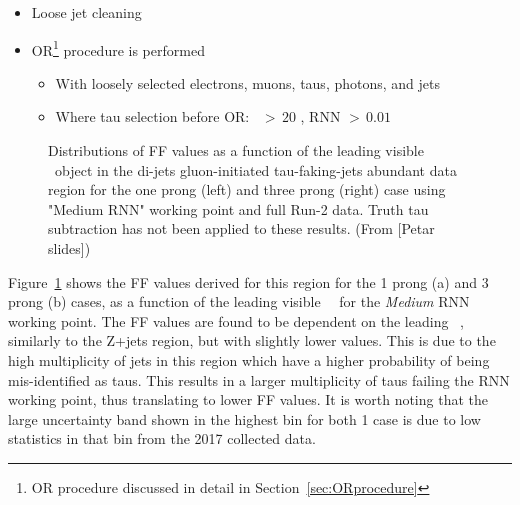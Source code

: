 \begin{itemize}
\begin{itemize}
	\end{itemize}
	\item Loose jet cleaning
	\item \ac{OR}\footnote{\ac{OR} procedure discussed in detail in Section~\ref{sec:ORprocedure}} procedure is performed
	\begin{itemize}
	\item With loosely selected electrons, muons, taus, photons, and jets
	\item Where tau selection before \ac{OR}: \pt\ $>\,20$ \gev, \ac{RNN} $>\,0.01$ 
	\end{itemize}
	\end{itemize}
	\begin{figure}[!htb]
	\begin{center}
			 				\hspace{0.05\textwidth}
							\hspace{0.05\textwidth}
	\end{center}
	\caption{Distributions of FF values as a function of the leading visible \htau\ object in the di-jets gluon-initiated tau-faking-jets abundant data region for the one prong (left) and three prong (right) case using "Medium RNN" working point and full Run-2 data. Truth tau subtraction has not been applied to these results. (From [Petar slides])}
	\label{fig:Dijets_data_FF}
	\end{figure}
	Figure~\ref{fig:Dijets_data_FF} shows the FF values derived for this region for the 1 prong (a) and 3 prong (b) cases, as a function of the leading visible \htau\ \pt\ for the \textit{Medium} RNN working point. The FF values are found to be dependent on the leading \htau\ \pt, similarly to the Z+jets region, but with slightly lower values. 
	This is due to the high multiplicity of jets in this region which have a higher probability of being mis-identified as taus. This results in a larger multiplicity of taus failing the RNN working point, thus translating to lower FF values.
	 It is worth noting that the large uncertainty band shown in the highest \pt bin for both 1 case is due to low statistics in that bin from the 2017 collected data. 
	
